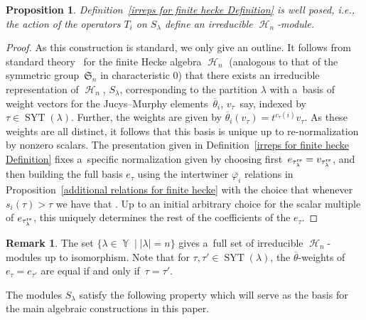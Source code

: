 \documentclass[pdftex]{sigma}
\numberwithin{equation}{section}
\newtheorem{Proposition}[Theorem]{Proposition}
\theoremstyle{definition}
\newtheorem{Remark}[Theorem]{Remark}
\DeclareMathOperator{\Par}{\mathbb{Y}}
\DeclareMathOperator{\SYT}{\mathrm{SYT}}
\DeclareMathOperator{\sH}{\mathscr{H}}
\begin{document}
\begin{Proposition}
 Definition~{\rm\ref{irreps for finite hecke Definition}} is well posed, i.e., the action of the operators $T_i$ on $S_{\lambda}$ define an irreducible $\sH_n$-module.
\end{Proposition}
\begin{proof}
 As this construction is standard, we only give an outline. It follows from standard theory~\cite[Theorem 3.9]{Murphy} for the finite Hecke algebra $\sH_n$ (analogous to that of the symmetric group~$\mathfrak{S}_n$ in characteristic $0$) that there exists an irreducible representation of $\sH_n$, $S_{\lambda}$, corresponding to the partition $\lambda$ with a~basis of weight vectors for the Jucys--Murphy elements~$\overline{\theta}_i$, $v_{\tau}$~say, indexed by $\tau \in \SYT(\lambda)$. Further, the weights are given by $\overline{\theta}_i(v_{\tau}) = t^{c_{\tau}(i)} v_{\tau}$. As these weights are all distinct, it follows that this basis is unique up to re-normalization by nonzero scalars.
 The presentation given in Definition~\ref{irreps for finite hecke Definition} fixes a~specific normalization given by choosing first~${e_{\tau^{\rm rs}_{\lambda}} = v_{\tau^{\rm rs}_{\lambda}}}$, and then building the full basis $e_{\tau}$ using the intertwiner $\overline{{\varphi_i}}$ relations in Proposition~\ref{additional relations for finite hecke} with the choice that whenever $s_i(\tau) > \tau$ we have that . Up to an initial arbitrary choice for the scalar multiple of $e_{\tau^{\rm rs}_{\lambda}}$, this uniquely determines the rest of the coefficients of the $e_{\tau}$.
\end{proof}

\begin{Remark}
 The set $\{ \lambda \in \Par \mid |\lambda| = n\}$ gives a~full set of irreducible $\sH_n$-modules up to isomorphism. Note that for $\tau,\tau' \in \SYT(\lambda)$, the $\overline{\theta}$-weights of $e_{\tau}= e_{\tau'}$ are equal if and only if~${\tau = \tau'}$.
\end{Remark}

The modules $S_{\lambda}$ satisfy the following property which will serve as the basis for the main algebraic constructions in this paper.
\end{document}
